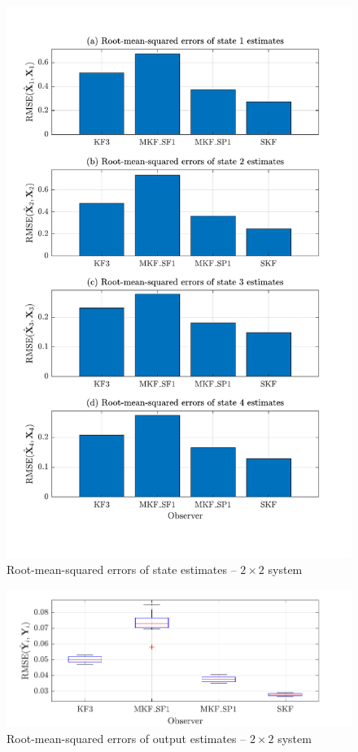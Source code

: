 \begin{figure}[htp]
	\centering
	\includegraphics[width=12cm]{images/rod_obs_sim2_all_seed_x_err_bar.pdf}
	\caption{Root-mean-squared errors of state estimates – $2\times2$ system}
	\label{fig:rod-obs-sim2-xest-RMSE-bar}
\end{figure}

\begin{figure}[htp]
	\centering
	\includegraphics[width=12cm]{images/rod_obs_sim2_all_seed_y_err_box.pdf}
	\caption{Root-mean-squared errors of output estimates – $2\times2$ system}
	\label{fig:rod-obs-sim2-yest-all-seed-RMSE-box}
\end{figure}



